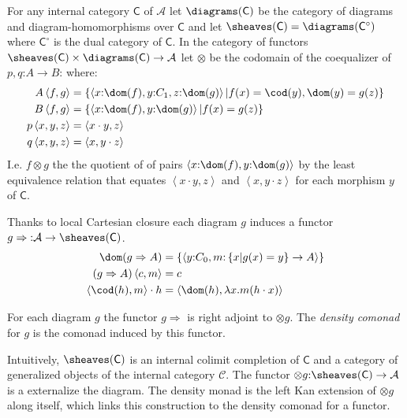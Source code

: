 \documentclass{tac}
\newcommand\hide[1]{}
\newcommand\cat\mathcal
\newcommand\icat\mathsf
\newcommand\of{\mathord:}
\newcommand\set[1]{\left\{#1\right\}}
\newcommand\dual{^\circ}
\newcommand\tuplet[1]{\left\langle #1 \right\rangle}
\begin{document}
\begin{definition}
For any internal category $\icat C$ of $\cat A$ 
let $\diagrams(\icat C)$ be the category of diagrams and diagram-homomorphisms over $\icat C$ and let $\sheaves(\icat C) = \diagrams(\icat C\dual)$ where $\icat C\dual$ is the dual category of $\icat C$. In the category of functors $\sheaves(\icat C)\times\diagrams(\icat C) \to\cat A$ let $\otimes$ be the codomain of the coequalizer of 
$p,q\of A\to B \of $ where:
\begin{align*}
A\tuplet{f,g} &= \set{\tuplet{x\of \dom(f),y\of C_1,z\of\dom(g)}|f(x) = \cod(y), \dom(y) = g(z)}\\
B\tuplet{f,g} &= \set{\tuplet{x\of \dom(f),y\of\dom(g)}|f(x) = g(z)}\\
p\tuplet{x,y,z}&=\tuplet{x\cdot y,z}\\
q\tuplet{x,y,z}&=\tuplet{x,y\cdot z}
\end{align*}
I.e. $f\otimes g$ the the quotient of of pairs $\tuplet{x\of\dom(f),y\of\dom(g)}$ by the least equivalence relation that equates $\tuplet{x\cdot y,z}$ and $\tuplet{x, y\cdot z}$ for each morphism $y$ of $\icat C$.

Thanks to local Cartesian closure each diagram $g$ induces a functor $g\Rightarrow  \of \cat A\to \sheaves(\icat C)$.
\begin{align*}
\dom(g\Rightarrow A) &= \set{\tuplet{y\of C_0,m\of\set{x | g(x) = y}\to A}}\\
(g\Rightarrow A)\tuplet{c,m} &= c\\
 \tuplet{\cod(h),m}\cdot h &= \tuplet{\dom(h),\lambda x.m(h\cdot x)}
\end{align*}

For each diagram $g$ the functor $g\Rightarrow$ is right adjoint to $\otimes g$. 
The \emph{density comonad} for $g$ is the comonad induced by this functor.
\end{definition}

Intuitively, $\sheaves(\icat C)$ is an internal colimit completion of $\icat C$ and a category of generalized objects of the internal category $\cat C$. The functor $\otimes g\of \sheaves(\icat C) \to \cat A$ is a externalize the diagram. The density monad is the left Kan extension of $\otimes g$ along itself, which links this construction to the density comonad for a functor.

\hide{
we will need to revisit the concepts and notions throughout this document

some guidelines:
- the greater the scope, the more descriptive the identifier
- keep refactoring
- define small generic components and compose them 
}
\end{document}
